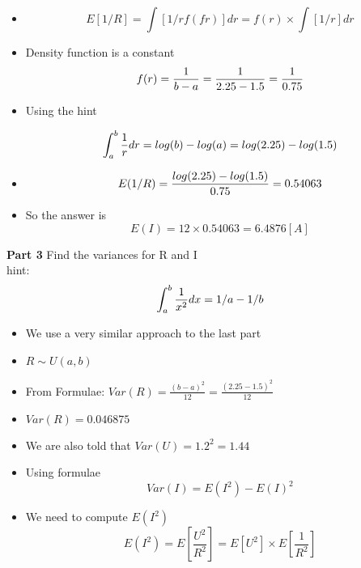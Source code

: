\begin{itemize}
\item \[ E[1/R] =  \int \left[1/r f(fr)\right] dr = f(r) \times \int \left[1/r \right] dr   \]
\item Density function is a constant
\[f(r) = {1 \over b-a}  = {1 \over 2.25 - 1.5} = {1\over 0.75}\]
\item Using the hint

\[ \int^b_a {1 \over r} dr =log(b) - log(a) = log(2.25) - log(1.5)  \]

\item \[ E(1/R) = {log(2.25) - log(1.5)  \over 0.75}  = 0.54063 \]

\item So the answer is
\[ E(I) = 12 \times 0.54063 = 6.4876 [A] \]
\end{itemize}






\noindent\textbf{Part 3} Find the variances for R and I\\


hint:
\[ \int^b_a {1 \over x^2} dx = 1/a - 1/b \]

\begin{itemize}

\item We use a very similar approach to the last part
\item $R \sim U(a,b)$
\item From Formulae:  $Var(R) = \frac{(b-a)^2}{12} = \frac{(2.25 - 1.5)^2 }{12}  $
\item $Var(R) = 0.046875$
\item We are also told that $Var(U) = 1.2^2 = 1.44 $
\item Using formulae \[Var(I) = E(I^2) - E(I)^2 \]
\item We need to compute $E(I^2)$
\[ E(I^2)= E \left[ \frac{U^2}{R^2} \right] = E[U^2] \times E \left[ \frac{1}{R^2} \right] \]



\end{itemize}







